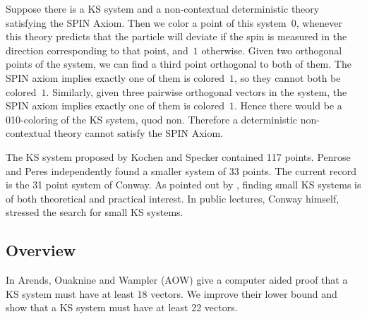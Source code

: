 \documentclass{report}
\begin{document}
{}

Suppose there is a KS system and a non-contextual deterministic theory satisfying
the SPIN Axiom.
Then we color a point of this system~$0$,
whenever this theory predicts that the particle will deviate
if the spin is measured in the direction corresponding to that
point, and~$1$ otherwise.
Given two orthogonal points of the system,
we can find a third point orthogonal to both of them.
The SPIN axiom implies exactly one of them is colored~$1$, so they
cannot both be colored~$1$.
Similarly, given three pairwise orthogonal vectors in the system,
the SPIN axiom implies exactly one of them is colored~$1$.
Hence there would be a 010-coloring of the KS system, quod non.
Therefore a deterministic non-contextual theory cannot satisfy the
SPIN Axiom.

The KS system proposed by Kochen and Specker contained 117 points\cite{ks}.
Penrose and Peres\cite{peres} independently found a smaller system of 33 points.
The current record is the 31 point system of Conway\cite[p.~197]{qtcm}.
As pointed out by \cite{c00,aow11}, finding small KS systems
is of both theoretical and practical interest.
In public lectures, Conway himself, stressed the search for small KS
systems.\cite{OC}

\subsection{Overview}
In \cite{aow11} Arends, Ouaknine and Wampler (AOW) give a computer aided proof
that a KS system must have at least 18 vectors.  We improve their lower bound
and show that a KS system must have at least 22 vectors.
\end{document}
